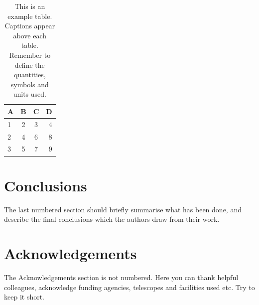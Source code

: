 \documentclass[fleqn,usenatbib]{mnras}
\begin{document}
\begin{table}
	\centering
	\caption{This is an example table. Captions appear above each table.
	Remember to define the quantities, symbols and units used.}
	\label{tab:example_table}
	\begin{tabular}{lccr} %
		\hline
		A & B & C & D\\
		\hline
		1 & 2 & 3 & 4\\
		2 & 4 & 6 & 8\\
		3 & 5 & 7 & 9\\
		\hline
	\end{tabular}
\end{table}


\section{Conclusions}

The last numbered section should briefly summarise what has been done, and describe
the final conclusions which the authors draw from their work.

\section*{Acknowledgements}

The Acknowledgements section is not numbered. Here you can thank helpful
colleagues, acknowledge funding agencies, telescopes and facilities used etc.
Try to keep it short.







%
\end{document}
